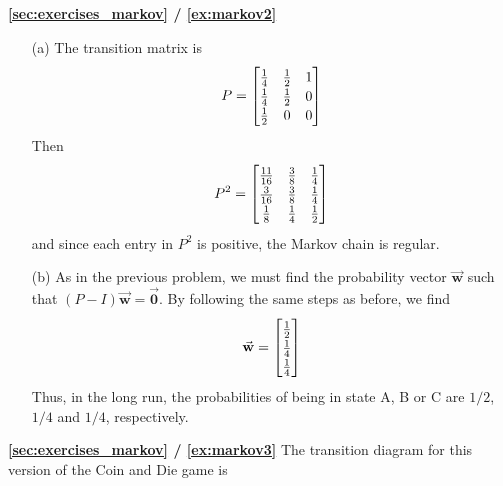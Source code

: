 \documentclass[reqno]{immbook}
\newcommand{\BW}{\vec{\textbf{w}}}
\newcommand{\BZero}{\vec{\textbf{0}}}  %
\newcommand{\T}{\rule{0pt}{2.6ex}}
\newcommand{\B}{\rule[-1.2ex]{0pt}{0pt}}
\numberwithin{equation}{chapter}
\numberwithin{question}{section}
\numberwithin{theorem}{chapter}
\numberwithin{figure}{chapter}
\theoremstyle{definition}
\begin{document}
\newpage
\textbf{\ref{sec:exercises_markov} / \ref{ex:markov2}}
\begin{enumerate}
\item[(a)] The transition matrix is
\[
  P = \begin{bmatrix}
           \frac{1}{4}  & \frac{1}{2} & 1 \T\B \\
	   \frac{1}{4}  & \frac{1}{2} & 0 \B \\
	   \frac{1}{2}  & 0   & 0 \B
      \end{bmatrix}
\]
Then
\[
  P^2 = \begin{bmatrix}
           \frac{11}{16}  & \frac{3}{8} & \frac{1}{4} \T\B \\
	   \frac{3}{16}  & \frac{3}{8} & \frac{1}{4} \B \\
	   \frac{1}{8}  & \frac{1}{4}   & \frac{1}{2} \B
      \end{bmatrix}
\]
and since each entry in $P^2$ is positive, the Markov chain
is regular.
\item[(b)]  As in the previous problem, we must find the probability
vector $\BW$ such that $(P-I)\BW=\BZero$.
By following the same steps as before, we find
\[
   \BW = \begin{bmatrix}
            \frac{1}{2} \T\B \\ \frac{1}{4} \B \\ \frac{1}{4} \B \\
         \end{bmatrix}
\]
Thus, in the long run, the probabilities of being in state A, B or C
are $1/2$, $1/4$ and $1/4$, respectively.
\end{enumerate}

\textbf{\ref{sec:exercises_markov} / \ref{ex:markov3}}
The transition diagram for this version of the Coin and Die game is
\end{document}
